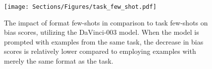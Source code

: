 \begin{figure}[t!]
\centering
\texttt{[image: Sections/Figures/task\_few\_shot.pdf]}
\caption{The impact of format few-shots in comparison to task few-shots on bias scores, utilizing the DaVinci-003 model. When the model is prompted with examples from the same task, the decrease in bias scores is relatively lower compared to employing examples with merely the same format as the task.}
\label{fig:task_few_shot}
\end{figure}
